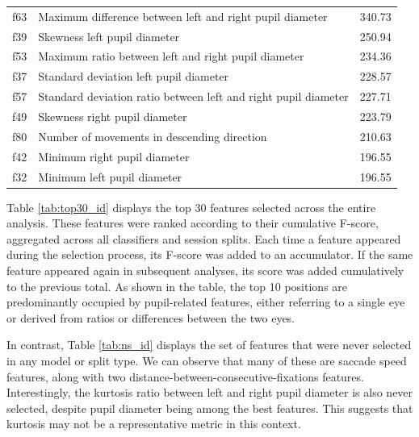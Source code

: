 \documentclass[12pt]{report}
\begin{document}
\begin{table}[htbp]
\begin{tabular}{lll}
f63 & Maximum difference between left and right pupil diameter & 340.73 \\
f39 & Skewness left pupil diameter & 250.94 \\
f53 & Maximum ratio between left and right pupil diameter & 234.36 \\
f37 & Standard deviation left pupil diameter & 228.57 \\
f57 & Standard deviation ratio between left and right pupil diameter & 227.71 \\
f49 & Skewness right pupil diameter & 223.79 \\
f80 & Number of movements in descending direction & 210.63 \\
f42 & Minimum right pupil diameter & 196.55 \\
f32 & Minimum left pupil diameter & 196.55 \\
\bottomrule
\end{tabular}
\end{table}

Table \ref{tab:top30_id} displays the top 30 features selected across the entire analysis.
These features were ranked according to their cumulative F-score, aggregated across all classifiers and session splits.
Each time a feature appeared during the selection process, its F-score was added to an accumulator. 
If the same feature appeared again in subsequent analyses, its score was added cumulatively to the previous total.
As shown in the table, the top 10 positions are predominantly occupied by pupil-related features, either referring to a single eye or derived from ratios or differences between the two eyes.

{\raggedright
In contrast, Table \ref{tab:ns_id} displays the set of features that were never selected in any model or split type.
We can observe that many of these are saccade speed features, along with two distance-between-consecutive-fixations features.
Interestingly, the kurtosis ratio between left and right pupil diameter is also never selected, despite pupil diameter being among the best features. 
This suggests that kurtosis may not be a representative metric in this context.
\par}
\end{document}
